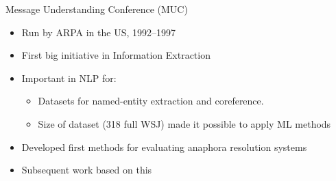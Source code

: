 \documentclass[dvipsnames, 10pt, compress]{beamer}
\begin{document}
\begin{frame}{Message Understanding Conference (MUC)}

\begin{itemize}
  \item Run by ARPA in the US, 1992--1997
  \item First big initiative in Information Extraction 
  \item Important in NLP for:
  \begin{itemize}
    \item Datasets for named-entity extraction and coreference.
    \item Size of dataset (318 full WSJ) made it possible to apply ML methods
  \end{itemize}
  \item Developed first methods for evaluating anaphora resolution systems 
  \item Subsequent work based on this
\end{itemize}


\end{frame}
\end{document}
